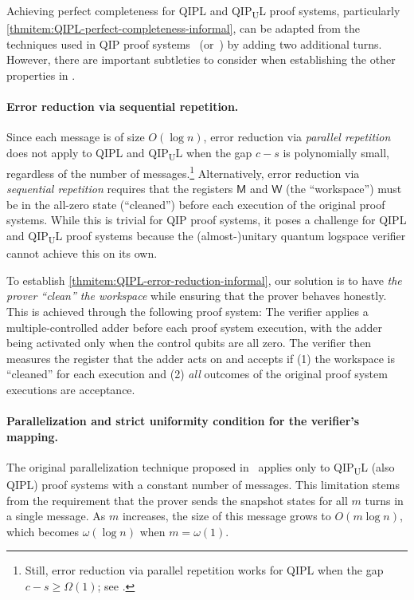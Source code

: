 \documentclass[11pt, a4paper]{article}
\numberwithin{equation}{section}
\numberwithin{figure}{section}
\newcommand{\QIP}{\textnormal{\textsf{QIP}}\xspace}
\newcommand{\QIPL}{\textnormal{\textsf{QIPL}}\xspace}
\newcommand{\QIPUL}{\texorpdfstring{\textnormal{\textsf{QIP}\textsubscript{\textnormal{U}}\textsf{L}}}\xspace}
\newcommand{\sfM}{\mathsf{M}}
\newcommand{\sfW}{\mathsf{W}}
\begin{document}
Achieving perfect completeness for \QIPL{} and \QIPUL{} proof systems, particularly \ref{thmitem:QIPL-perfect-completeness-informal}, can be adapted from the techniques used in \QIP{} proof systems~\cite[Section 4.2.1]{VW16} (or~\cite[Section 3]{KW00}) by adding two additional turns. However, there are important subtleties to consider when establishing the other properties in . 

\paragraph{Error reduction via sequential repetition.}
Since each message is of size $O(\log n)$, error reduction via \textit{parallel repetition} does not apply to \QIPL{} and \QIPUL{} when the gap $c-s$ is polynomially small, regardless of the number of messages.\footnote{Still, error reduction via parallel repetition works for \QIPL{} when the gap $c-s \geq \Omega(1)$; see .} Alternatively, error reduction via \textit{sequential repetition} requires that the registers $\sfM$ and $\sfW$ (the ``workspace'') must be in the all-zero state (``cleaned'') before each execution of the original proof systems. While this is trivial for \QIP{} proof systems, it poses a challenge for \QIPL{} and \QIPUL{} proof systems because the (almost-)unitary quantum logspace verifier cannot achieve this on its own. 

To establish \ref{thmitem:QIPL-error-reduction-informal}, our solution is to have \textit{the prover ``clean'' the workspace} while ensuring that the prover behaves honestly. This is achieved through the following proof system: The verifier applies a multiple-controlled adder before each proof system execution, with the adder being activated only when the control qubits are all zero. The verifier then measures the register that the adder acts on and accepts if (1) the workspace is ``cleaned'' for each execution and (2) \textit{all} outcomes of the original proof system executions are acceptance. 

\paragraph{Parallelization and strict uniformity condition for the verifier's mapping.}
The original parallelization technique proposed in~\cite[Section 4]{KW00} applies only to \QIPUL{} (also \QIPL{}) proof systems with a constant number of messages. This limitation stems from the requirement that the prover sends the snapshot states for all $m$ turns in a single message. As $m$ increases, the size of this message grows to $O(m \log n)$, which becomes $\omega(\log n)$ when $m = \omega(1)$. 
\end{document}
